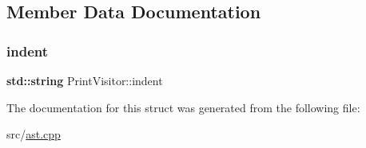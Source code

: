 \subsection{Member Data Documentation}
\mbox{\label{struct_print_visitor_a6cda79fa0db4cc99a40958601fbbcc37}} 
\subsubsection{\texorpdfstring{indent}{indent}}
{\footnotesize\ttfamily \textbf{ std\+::string} Print\+Visitor\+::indent}



The documentation for this struct was generated from the following file\+:\begin{DoxyCompactItemize}
\item 
src/\hyperlink{ast_8cpp}{ast.\+cpp}\end{DoxyCompactItemize}
